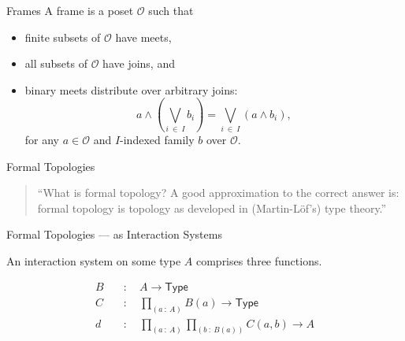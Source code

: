 \documentclass[xcolor={dvipsnames}]{beamer}
\newcommand{\pity}[3]{\prod_{(#1~:~#2)} #3}
\newcommand{\univ}{\mathsf{Type}}
\begin{document}
\begin{frame}{Frames}
  A \alert{frame} is a poset $\mathcal{O}$ such that
  \begin{itemize}
    \item \alert{finite subsets} of $\mathcal{O}$ have \alert{meets},
    \item \alert{all subsets} of $\mathcal{O}$ have \alert{joins}, and
    \item binary meets distribute over arbitrary joins:
      \begin{equation*}
        a \wedge \left( \bigvee_{i~\in~I} b_i \right) = \bigvee_{i~\in~I} \left( a \wedge b_i \right),
      \end{equation*}
      for any $a \in \mathcal{O}$ and $I$-indexed family $b$ over $\mathcal{O}$.
  \end{itemize}

\end{frame}

\begin{frame}{Formal Topologies}
  \large
  \begin{quote}
    ``What is formal topology? A good approximation to the correct answer is: formal
    topology is topology as developed in (Martin-Löf's) type theory.''
  \end{quote}

  \vspace{2em}

\end{frame}

\begin{frame}{Formal Topologies --- as Interaction Systems}
  \large

  An \alert{interaction system} on some type $A$ comprises three functions.

  \begin{align*}
    B  &\quad:\quad A \rightarrow \univ{}                              \\
    C  &\quad:\quad \pity{a}{A}{B(a) \rightarrow \univ{}}              \\
    d  &\quad:\quad \pity{a}{A}{\pity{b}{B(a)}{C(a, b) \rightarrow A}}
  \end{align*}
\end{frame}
\end{document}
